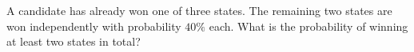 A candidate has already won one of three states. The remaining two states are won independently with probability $40\%$ each. What is the probability of winning at least two states in total?
